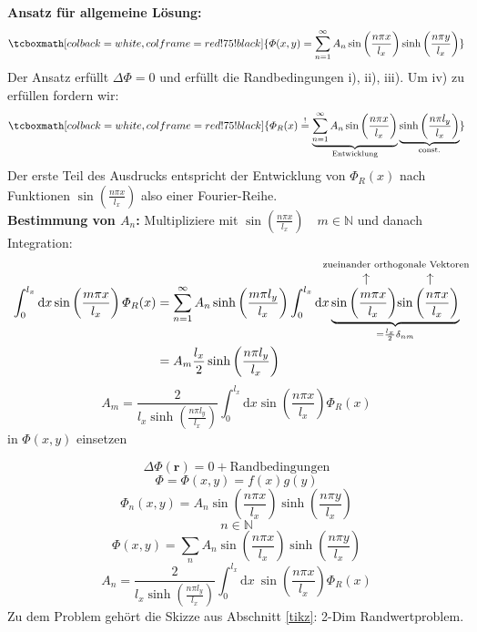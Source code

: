 \documentclass[titlepage,11pt,a4paper,ngerman]{report}
\newcommand{\tx}[1]{\textrm{#1}}
\newcommand{\const}{\tx{const.}}
\newcommand{\ub}[1]{\underbrace{#1}}
\newcommand{\dd}{\tx{d}}
\newcommand{\custoup}[3]{\overset{\scriptstyle\underset{\mkern4mu\rotatebox{-90}{$\hspace{-3pt} #1$}}{#3}}{#2}}
\renewcommand{\Phi}{\varPhi}
\newcommand{\intt}[2]{\int_{#1}^{#2}}
\renewcommand{\vec}[1]{\boldsymbol{#1}}
\newcommand{\rmbox}[1]{\tcboxmath[colback=white,colframe=red!75!black]{#1}}
\newcommand{\bbb}[2]{\begin{tcolorbox}[colback=white,colframe=black,fonttitle=\bfseries,title=#1,sharp corners,tcbox raise base]#2\end{tcolorbox}}
\begin{document}
\textbf{Ansatz für allgemeine Lösung:}
\begin{equation*}
\rmbox{\Phi(x,y) = \sum_{n=1}^{\infty} A_n \sin \left(\frac{n \pi x}{l_x}\right) \sinh \left(\frac{n \pi y}{l_x}\right)}
\end{equation*}
Der Ansatz erfüllt $ \Delta \Phi = 0 $ und erfüllt die Randbedingungen i), ii), iii). Um iv) zu erfüllen fordern wir:
\begin{equation*}
\rmbox{\Phi_R(x) \buildrel ! \over = \ub{\sum_{n=1}^{\infty} A_n \sin\left(\frac{n \pi x}{l_x}\right)}_{\tx{Entwicklung}} \ub{\sinh\left(\frac{n \pi l_y}{l_x}\right)}_{\const}}
\end{equation*}
Der erste Teil des Ausdrucks entspricht der Entwicklung von $ \Phi_R(x) $ nach Funktionen $ \sin \left(\frac{n \pi x}{l_x}\right) $ also einer Fourier-Reihe.\\[5pt]
\textbf{Bestimmung von $ A_n $:}
Multipliziere mit $ \sin\left(\frac{n \pi x}{l_x}\right) \quad m \in \mathbb{N} $ und danach Integration:
\begin{align*}
\int_{0}^{l_x} \dd x \sin\left(\frac{m \pi x}{l_x}\right) \Phi_R (x) &= \sum_{n=1}^{\infty} A_n \sinh\left(\frac{m \pi l_y}{l_x}\right) \int_{0}^{l_x} \dd x \ub{\custoup{\leftarrow}{\sin\left(\frac{m \pi x}{l_x}\right)}{\qquad \qquad \quad \mathclap{\tx{zueinander orthogonale Vektoren}}} \custoup{\leftarrow}{\sin\left(\frac{n \pi x}{l_x}\right)}{}}_{= \frac{l_x}{2} \delta_{nm}}\\
&= A_m \frac{l_x}{2} \sinh\left(\frac{n \pi l_y}{l_x}\right)
\end{align*}
\begin{equation*}
A_m = \frac{2}{l_x \sinh\left(\frac{n \pi l_y}{l_x}\right)} \int_{0}^{l_x} \dd x \sin \left(\frac{n \pi x}{l_x}\right) \Phi_R(x)
\end{equation*}
in $ \Phi(x,y) $ einsetzen\\[5pt]


\bbb{Wiederholung}{$$\Delta \Phi(\vec{r}) = 0 + \textrm{Randbedingungen}$$
$$\Phi = \Phi(x,y) = f(x)g(y)$$
$$\Phi_n(x,y) = A_n \sin\left(\frac{n \pi x}{l_x}\right) \sinh\left(\frac{n \pi y}{l_x}\right)$$
$$n \in \mathbb N$$
$$\Phi(x,y) = \sum_n A_n \sin\left(\frac{n \pi x}{l_x}\right) \sinh\left(\frac{n \pi y}{l_x}\right)$$
$$A_n = \frac{2}{l_x \sinh\left(\frac{n \pi l_y}{l_x}\right)} \intt{0}{l_x}\textrm{d}x\ \sin\left(\frac{n \pi x}{l_x}\right) \Phi_R (x)$$
Zu dem Problem gehört die Skizze aus Abschnitt \ref{tikz}: 2-Dim Randwertproblem.}
\end{document}
